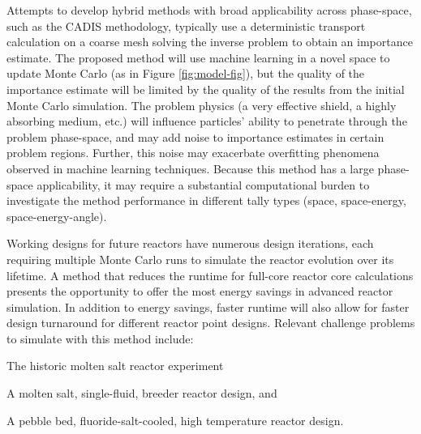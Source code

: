 \documentclass[letterpaper,12pt]{article}
\begin{document}
Attempts to develop hybrid methods with broad
applicability across phase-space, such as the CADIS
methodology\cite{haghighat_monte_2003}, typically
use a deterministic transport calculation on a coarse mesh solving the inverse problem to obtain an importance
estimate\cite{zhang_global_2014, zhang_adjoint-based_2011, haghighat_monte_2003,
hendricks_mcnp_1985}. The proposed method will use machine learning in a novel space to
update Monte Carlo (as in Figure \ref{fig:model-fig}), but the quality of the 
importance estimate will be limited
by the quality of the results from the initial Monte Carlo simulation. The
problem physics (a very effective shield, a highly absorbing medium, etc.) will
influence particles' ability to penetrate through the problem phase-space, and 
may add noise to importance estimates in certain problem regions\cite{van_wijk_easy_2011}. Further, this noise may exacerbate overfitting phenomena observed in
machine learning techniques. Because this method has a large phase-space
applicability, it may require a substantial computational burden to investigate
the method performance in different tally types (space, space-energy,
space-energy-angle).




Working designs for future reactors have numerous design iterations, each 
requiring multiple Monte Carlo runs to simulate the reactor evolution over its 
lifetime.  A method that reduces the runtime for full-core reactor core 
calculations presents the opportunity to offer the most energy savings in 
advanced reactor simulation.  In addition to energy savings, faster runtime 
will also allow for faster design turnaround for different reactor point 
designs. Relevant challenge problems to simulate with this method include:

\begin{compactitem}
  \item The historic molten salt reactor experiment \cite{robertson_msre_1965}
  \item A molten salt, single-fluid, breeder
    reactor design\cite{robertson_conceptual_1971}, and
  \item A pebble bed, fluoride-salt-cooled, high temperature
    reactor design\cite{andreades_design_2016}.
\end{compactitem}
\end{document}
